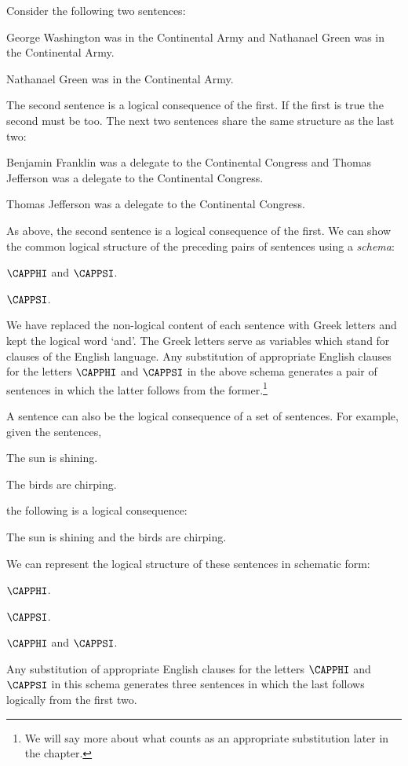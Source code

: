 Consider the following two sentences:
\begin{smenumerate}
	\item George Washington was in the Continental Army and Nathanael Green was in the Continental Army.
	\item Nathanael Green was in the Continental Army.
\end{smenumerate}
The second sentence is a logical consequence of the first. If the first is true the second must be too. The next two sentences share the same structure as the last two:
\begin{menumerate}
	\item Benjamin Franklin was a delegate to the Continental Congress and Thomas Jefferson was a delegate to the Continental Congress.
	\item Thomas Jefferson was a delegate to the Continental Congress.
\end{menumerate}
As above, the second sentence is a logical consequence of the first. We can show the common logical structure of the preceding pairs of sentences using a \emph{schema}:
\begin{menumerate}
	\item $\CAPPHI$ and $\CAPPSI$.
	\item $\CAPPSI$.
\end{menumerate}
We have replaced the non-logical content of each sentence with Greek letters and kept the logical word `and'. The Greek letters serve as variables which stand for clauses of the English language. Any substitution of appropriate English clauses for the letters $\CAPPHI$ and $\CAPPSI$ in the above schema generates a pair of sentences in which the latter follows from the former.\footnote{We will say more about what counts as an appropriate substitution later in the chapter.}

A sentence can also be the logical consequence of a set of sentences. For example, given the sentences,
\begin{menumerate}
	\item The sun is shining.
	\item\label{Birds} The birds are chirping.
\end{menumerate}
the following is a logical consequence:
\begin{menumerate}
	\item The sun is shining and the birds are chirping.
\end{menumerate}
We can represent the logical structure of these sentences in schematic form:
\begin{menumerate}
	\item $\CAPPHI$.
	\item $\CAPPSI$.
	\item $\CAPPHI$ and $\CAPPSI$.
\end{menumerate}
Any substitution of appropriate English clauses for the letters $\CAPPHI$ and $\CAPPSI$ in this schema generates three sentences in which the last follows logically from the first two.

